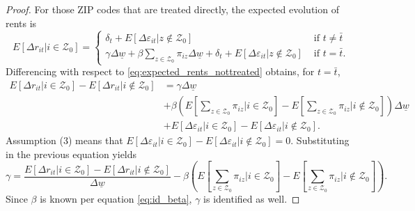 \documentclass{article}
\newcommand{\Z}{\mathcal{Z}}
\newcommand{\mw}{\underline{w}}
\begin{document}
\begin{proof}
    For those ZIP codes that are treated directly, the expected evolution of 
    rents is
    \begin{equation*}\label{eq:expected_rents_treated}
        E[\Delta r_{it} | i\in\Z_0] = 
        \begin{cases}
            \delta_t + E[\Delta \varepsilon_{it} | z\notin\Z_0] 
                                       & \text{ if } t\neq\bar{t} \\
            \gamma\Delta\mw + \beta\sum_{z\in\Z_0}\pi_{iz}\Delta\mw + \delta_t 
                     + E[\Delta \varepsilon_{it} | z\notin\Z_0] 
                                       & \text{ if } t=\bar{t} .
        \end{cases}
    \end{equation*}
    Differencing with respect to \eqref{eq:expected_rents_nottreated} obtains, 
    for $t=\bar{t}$,
    \begin{equation*}
        \begin{split}
            E[\Delta r_{it} | i\in\Z_0] - E[\Delta r_{it} | i\notin\Z_0] 
              & = \gamma \Delta \mw  \\
              & + \beta \left(E\left[\sum_{z\in\Z_0}\pi_{iz} \Big| i\in\Z_0\right]
                           - E\left[\sum_{z\in\Z_0}\pi_{iz} \Big| i\notin\Z_0\right]\right) \Delta \mw  \\
              & + E[\Delta \varepsilon_{it} | i\in\Z_0] - E[\Delta \varepsilon_{it} | i\notin\Z_0] .
        \end{split}
    \end{equation*}
    Assumption (3) means that
    $E[\Delta \varepsilon_{it} | i\in\Z_0] 
      - E[\Delta \varepsilon_{it} | i\notin\Z_0] = 0$.
    Substituting in the previous equation yields
    \begin{equation}\label{eq:id_gamma}
        \gamma = \frac{E[\Delta r_{it} | i\in\Z_0] - E[\Delta r_{it} | i\notin\Z_0]}{\Delta\mw}
            - \beta \left(E\left[\sum_{z\in\Z_0}\pi_{iz} \Big| i\in\Z_0   \right] 
                        - E\left[\sum_{z\in\Z_0}\pi_{iz} \Big| i\notin\Z_0\right]\right) .
    \end{equation}
    Since $\beta$ is known per equation \eqref{eq:id_beta}, $\gamma$ is identified
    as well.
\end{proof}
\end{document}
